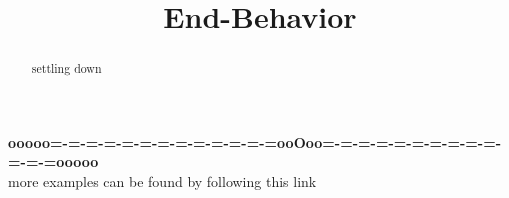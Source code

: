 \documentclass{ximera}
\title{End-Behavior}
\begin{document}
\begin{abstract}
settling down
\end{abstract}
\maketitle







\begin{center}
\textbf{\textcolor{green!50!black}{ooooo=-=-=-=-=-=-=-=-=-=-=-=-=ooOoo=-=-=-=-=-=-=-=-=-=-=-=-=ooooo}} \\

more examples can be found by following this link\\ 

\end{center}
\end{document}
